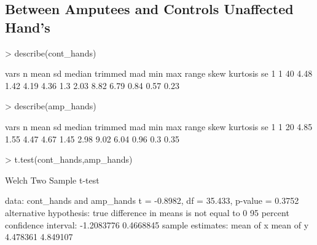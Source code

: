 \documentclass{article}
\begin{document}
\subsection*{Between Amputees and Controls Unaffected Hand's}
\begin{Schunk}
\begin{Sinput}
> describe(cont_hands)
\end{Sinput}
\begin{Soutput}
  vars  n mean   sd median trimmed mad  min  max range skew kurtosis   se
1    1 40 4.48 1.42   4.19    4.36 1.3 2.03 8.82  6.79 0.84     0.57 0.23
\end{Soutput}
\begin{Sinput}
> describe(amp_hands)
\end{Sinput}
\begin{Soutput}
  vars  n mean   sd median trimmed  mad  min  max range skew kurtosis   se
1    1 20 4.85 1.55   4.47    4.67 1.45 2.98 9.02  6.04 0.96      0.3 0.35
\end{Soutput}
\begin{Sinput}
> t.test(cont_hands,amp_hands)
\end{Sinput}
\begin{Soutput}
	Welch Two Sample t-test

data:  cont_hands and amp_hands
t = -0.8982, df = 35.433, p-value = 0.3752
alternative hypothesis: true difference in means is not equal to 0
95 percent confidence interval:
 -1.2083776  0.4668845
sample estimates:
mean of x mean of y 
 4.478361  4.849107 
\end{Soutput}
\end{Schunk}

\newpage
\end{document}
